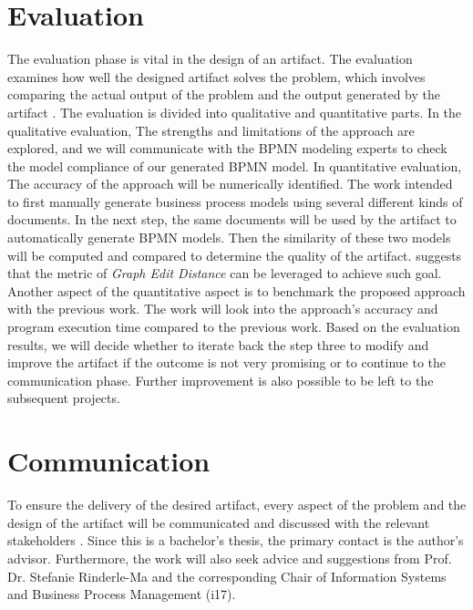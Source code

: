 \section{Evaluation}
The evaluation phase is vital in the design of an artifact. The evaluation examines how well the designed artifact solves the problem, which involves comparing the actual output of the problem and the output generated by the artifact \cite{DSM_3}. The evaluation is divided into qualitative and quantitative parts. In the qualitative evaluation, The strengths and limitations of the approach are explored, and we will communicate with the BPMN modeling experts to check the model compliance of our generated BPMN model. In quantitative evaluation, The accuracy of the approach will be numerically identified. The work intended to first manually generate business process models using several different kinds of documents. In the next step, the same documents will be used by the artifact to automatically generate BPMN models. Then the similarity of these two models will be computed and compared to determine the quality of the artifact. \cite{t2m_1} suggests that the metric of \textit{Graph Edit Distance} can be leveraged to achieve such goal. Another aspect of the quantitative aspect is to benchmark the proposed approach with the previous work. The work will look into the approach's accuracy and program execution time compared to the previous work. Based on the evaluation results, we will decide whether to iterate back the step three to modify and improve the artifact if the outcome is not very promising or to continue to the communication phase. Further improvement is also possible to be left to the subsequent projects.

\section{Communication}
To ensure the delivery of the desired artifact, every aspect of the problem and the design of the artifact will be communicated and discussed with the relevant stakeholders \cite{DSM_3}. Since this is a bachelor's thesis, the primary contact is the author's advisor. Furthermore, the work will also seek advice and suggestions from Prof. Dr. Stefanie Rinderle-Ma and the corresponding Chair of Information Systems and Business Process Management (i17). 




